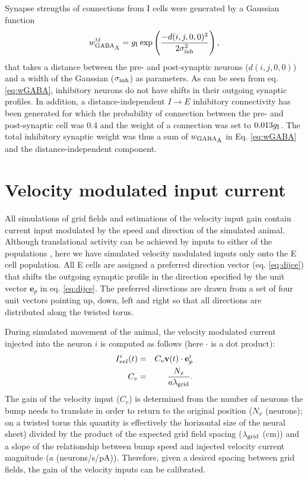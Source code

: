 \documentclass[a4paper,12pt]{article}
\newcommand{\ssc}[3]{\ensuremath{#1_{\text{#2}_{\text{#3}}}}}
\newcommand{\wGABAA  }{\ssc{w}      {\scriptsize{GABA}}{\scriptsize{A}}}
\newcommand{\sigmasub}[1]{\ssc{\sigma}{\scriptsize{#1}}{}}
\newcommand{\gI      }{\ssc{g}      {\scriptsize{I}}{}}
\newcommand{\dijzz}{\ensuremath{d(i, j, 0, 0)}}
\newcommand{\lamgrid}{\ssc{\lambda}{\scriptsize{grid}}{}}
\begin{document}
Synapse strengths of connections from I cells were generated by a Gaussian
function
\begin{equation}
    \wGABAA^{ij} = \gI \exp\left(\frac{-d(i, j, 0, 0)^2}{2 \sigmasub{inh}^2}\right),
    \label{eq:wGABA}
\end{equation}
that takes a distance between the pre- and post-synaptic neurons (\dijzz) and a
width of the Gaussian (\sigmasub{inh}) as parameters. As can be seen from eq.
\eqref{eq:wGABA}, inhibitory neurons do not have shifts in their outgoing
synaptic profiles. In addition, a distance-independent $I \rightarrow E$
inhibitory connectivity has been generated for which the probability of connection
between the pre- and post-synaptic cell was 0.4 and the weight of a connection
was set to $0.013\gI$. The total inhibitory synaptic weight was thus a sum of
$\wGABAA$ in Eq. \eqref{eq:wGABA} and the distance-independent component.




\section{Velocity modulated input current } \label{sec:Ivel}

All simulations of grid fields and estimations of the velocity input gain
contain current input modulated by the speed and direction of the simulated
animal. Although translational activity can be achieved by inputs to either of
the populations \citep{Pastoll:2013ff}, here we have simulated velocity
modulated inputs only onto the E cell population. All E cells are assigned a
preferred direction vector (eq. \ref{eq:dijce}) that shifts the outgoing
synaptic profile in the direction specified by the unit vector $\mathbf{e}_p$
in eq. \eqref{eq:dijce}. The preferred directions are drawn from a set of four
unit vectors pointing up, down, left and right so that all directions are
distributed along the twisted torus.

During simulated movement of the animal, the velocity modulated current
injected into the neuron $i$ is computed as follows (here $\cdot$ is a dot
product):
\begin{eqnarray*}
    I_{vel}^i(t) &=& C_v \mathbf{v}(t) \cdot \mathbf{e}_p^i \\
    C_v          &=& \frac{N_x}{a\lamgrid}.
\end{eqnarray*}
The gain of the velocity input ($C_v$) is determined from the number of neurons
the bump needs to translate in order to return to the original position
($N_x$ (neurons); on a twisted torus this quantity is effectively the horizontal size of
the neural sheet) divided by the product of the expected grid field spacing
($\lamgrid$ (cm)) and a slope of the relationship between bump speed and injected
velocity current magnitude ($a$ (neurons/s/pA)). Therefore, given a desired
spacing between grid fields, the gain of the velocity inputs can be calibrated.
\end{document}
